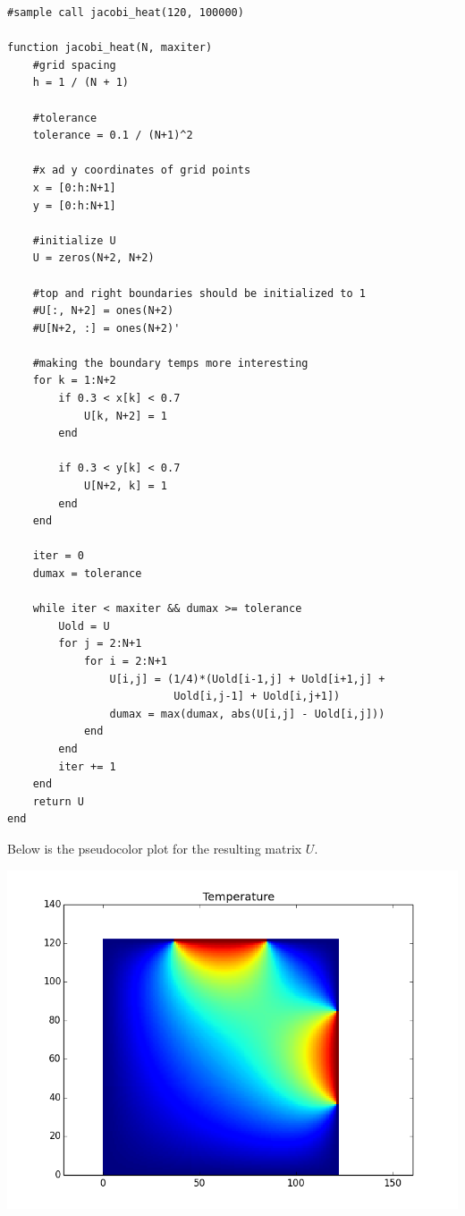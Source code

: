 \documentclass[11pt,a4paper,oneside]{report}
\begin{document}
\begin{verbatim}
#sample call jacobi_heat(120, 100000)

function jacobi_heat(N, maxiter)
    #grid spacing
    h = 1 / (N + 1)
    
    #tolerance
    tolerance = 0.1 / (N+1)^2
    
    #x ad y coordinates of grid points
    x = [0:h:N+1]
    y = [0:h:N+1]
    
    #initialize U
    U = zeros(N+2, N+2)
    
    #top and right boundaries should be initialized to 1
    #U[:, N+2] = ones(N+2)
    #U[N+2, :] = ones(N+2)'
    
    #making the boundary temps more interesting
    for k = 1:N+2
        if 0.3 < x[k] < 0.7
            U[k, N+2] = 1
        end
        
        if 0.3 < y[k] < 0.7  
            U[N+2, k] = 1
        end
    end
    
    iter = 0
    dumax = tolerance
    
    while iter < maxiter && dumax >= tolerance
        Uold = U 
        for j = 2:N+1
            for i = 2:N+1
                U[i,j] = (1/4)*(Uold[i-1,j] + Uold[i+1,j] +
                          Uold[i,j-1] + Uold[i,j+1])
                dumax = max(dumax, abs(U[i,j] - Uold[i,j]))
            end
        end
        iter += 1
    end
    return U
end
\end{verbatim}

Below is the pseudocolor plot for the resulting matrix $U$.

\begin{center}
\includegraphics[width=7.25in]{pcolor.png}\\
\end{center}
\end{document}
